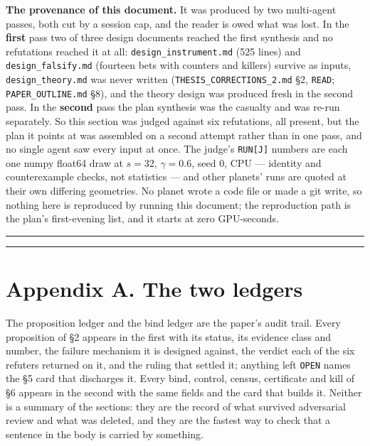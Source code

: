 \documentclass[11pt,a4paper]{article}
\theoremstyle{plain}
\theoremstyle{definition}
\theoremstyle{remark}
\begin{document}
\textbf{The provenance of this document.} It was produced by two
multi-agent passes, both cut by a session cap, and the reader is owed
what was lost. In the \textbf{first} pass two of three design documents
reached the first synthesis and no refutations reached it at all:
\texttt{design\_instrument.md} (525 lines) and
\texttt{design\_falsify.md} (fourteen bets with counters and killers)
survive as inputs, \texttt{design\_theory.md} was never written
(\texttt{THESIS\_CORRECTIONS\_2.md} §2, \texttt{READ};
\texttt{PAPER\_OUTLINE.md} §8), and the theory design was produced fresh
in the second pass. In the \textbf{second} pass the plan synthesis was
the casualty and was re-run separately. So this section was judged
against six refutations, all present, but the plan it points at was
assembled on a second attempt rather than in one pass, and no single
agent saw every input at once. The judge's \texttt{RUN{[}J{]}} numbers
are each one numpy float64 draw at \(s=32\), \(\gamma=0.6\), seed 0, CPU
--- identity and counterexample checks, not statistics --- and other
planets' runs are quoted at their own differing geometries. No planet
wrote a code file or made a git write, so nothing here is reproduced by
running this document; the reproduction path is the plan's first-evening
list, and it starts at zero GPU-seconds.

\begin{center}\rule{0.5\linewidth}{0.5pt}\end{center}

\begin{center}\rule{0.5\linewidth}{0.5pt}\end{center}

\section{Appendix A. The two ledgers}\label{appendix-a.-the-two-ledgers}

The proposition ledger and the bind ledger are the paper's audit trail.
Every proposition of §2 appears in the first with its status, its
evidence class and number, the failure mechanism it is designed against,
the verdict each of the six refuters returned on it, and the ruling that
settled it; anything left \texttt{OPEN} names the §5 card that
discharges it. Every bind, control, census, certificate and kill of §6
appears in the second with the same fields and the card that builds it.
Neither is a summary of the sections: they are the record of what
survived adversarial review and what was deleted, and they are the
fastest way to check that a sentence in the body is carried by
something.
\end{document}
